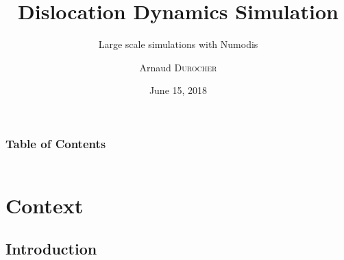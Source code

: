\documentclass[aspectratio=1610,t,10pt]{beamer}
\title{Dislocation Dynamics Simulation}
\subtitle{Large scale simulations with Numodis}
\date{June 15, 2018}
\author[Arnaud Durocher]{Arnaud \textsc{Durocher}}
\institute[MdlS]{}
\begin{document}
\captionsetup{size=footnotesize,justification=centering,skip=1pt}

\begin{frame}[plain]
    \titlepage
\end{frame}

\begin{frame}
	\frametitle{Table of Contents}
	\framesubtitle{}
	\begin{columns}[t]
		\begin{column}{\textwidth}
			\tableofcontents
		\end{column}
	\end{columns}
\end{frame}

\section{Context}

\subsection{Introduction}
\end{document}
